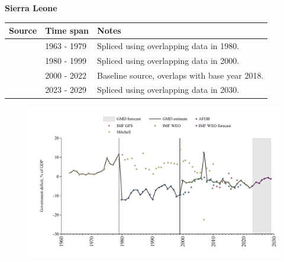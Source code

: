\documentclass[12pt,a4paper,landscape]{article}
\begin{document}
\begin{adjustbox}{max totalsize={\paperwidth}{\paperheight},center}
\begin{minipage}[t][\textheight][t]{\textwidth}
\vspace*{0.5cm}
{}
\begin{center}
{\Large\bfseries Sierra Leone}
\end{center}
\vspace{0.5cm}
\begin{table}[H]
\centering
\small
\begin{tabular}{|l|l|l|}
\hline
\textbf{Source} & \textbf{Time span} & \textbf{Notes} \\
\hline
\rowcolor{white}\cite{Mitchell}& 1963 - 1979 &Spliced using overlapping data in 1980.\\
\rowcolor{lightgray}\cite{AFDB}& 1980 - 1999 &Spliced using overlapping data in 2000.\\
\rowcolor{white}\cite{IMF_WEO}& 2000 - 2022 &Baseline source, overlaps with base year 2018.\\
\rowcolor{lightgray}\cite{IMF_WEO_forecast}& 2023 - 2029 &Spliced using overlapping data in 2030.\\
\hline
\end{tabular}
\end{table}
\begin{figure}[H]
\centering
\includegraphics[width=\textwidth,height=0.6\textheight,keepaspectratio]{graphs/SLE_govdef_GDP.pdf}
\end{figure}
\end{minipage}
\end{adjustbox}
\end{document}
